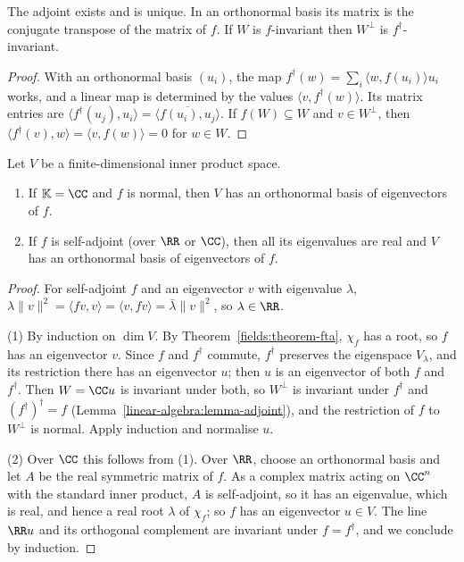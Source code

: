\begin{lemma}\label{linear-algebra:lemma-adjoint}
The adjoint exists and is unique. In an orthonormal basis its matrix is the conjugate transpose of the
matrix of $f$. If $W$ is $f$-invariant then $W^\perp$ is $f^\dagger$-invariant.
\end{lemma}

\begin{proof}
With an orthonormal basis $(u_i)$, the map $f^\dagger(w) = \sum_i \langle w, f(u_i) \rangle u_i$ works, and a linear map
is determined by the values $\langle v, f^\dagger(w) \rangle$. Its matrix entries are
$\langle f^\dagger(u_j), u_i \rangle = \overline{\langle f(u_i), u_j\rangle}$. If $f(W) \subseteq W$ and $v \in W^\perp$, then
$\langle f^\dagger(v), w \rangle = \langle v, f(w) \rangle = 0$ for $w \in W$.
\end{proof}

\begin{theorem}\label{linear-algebra:theorem-spectral}
Let $V$ be a finite-dimensional inner product space.
\begin{enumerate}
\item If $\mathbb{K} = \CC$ and $f$ is normal, then $V$ has an orthonormal basis of eigenvectors of $f$.
\item If $f$ is self-adjoint (over $\RR$ or $\CC$), then all its eigenvalues are real and $V$ has an orthonormal
basis of eigenvectors of $f$.
\end{enumerate}
\end{theorem}

\begin{proof}
For self-adjoint $f$ and an eigenvector $v$ with eigenvalue $\lambda$,
$\lambda\|v\|^2 = \langle f v, v \rangle = \langle v, fv \rangle = \bar\lambda\|v\|^2$, so $\lambda \in \RR$.

(1) By induction on $\dim V$. By Theorem~\ref{fields:theorem-fta}, $\chi_f$ has a root, so $f$ has an eigenvector
$v$. Since $f$ and $f^\dagger$ commute, $f^\dagger$ preserves the eigenspace $V_\lambda$, and its restriction there has
an eigenvector $u$; then $u$ is an eigenvector of both $f$ and $f^\dagger$. Then $W = \CC u$ is invariant under
both, so $W^\perp$ is invariant under $f^\dagger$ and $(f^\dagger)^\dagger = f$ (Lemma~\ref{linear-algebra:lemma-adjoint}),
and the restriction of $f$ to $W^\perp$ is normal. Apply induction and normalise $u$.

(2) Over $\CC$ this follows from (1). Over $\RR$, choose an orthonormal basis and let $A$ be the real symmetric
matrix of $f$. As a complex matrix acting on $\CC^n$ with the standard inner product, $A$ is self-adjoint, so
it has an eigenvalue, which is real, and hence a real root $\lambda$ of $\chi_f$; so $f$ has an eigenvector $u \in V$.
The line $\RR u$ and its orthogonal complement are invariant under $f = f^\dagger$, and we conclude by induction.
\end{proof}

